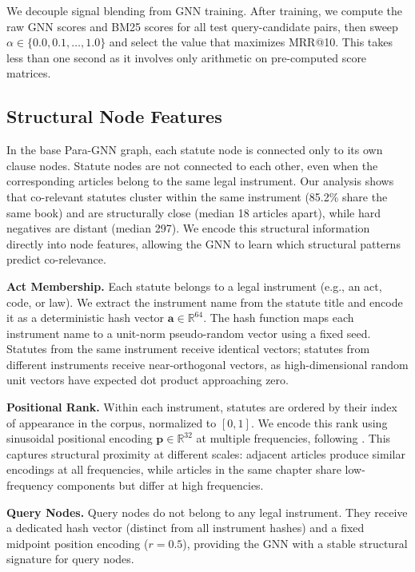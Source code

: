 We decouple signal blending from GNN training. After training, we compute the raw GNN scores and BM25 scores for all test query-candidate pairs, then sweep $\alpha \in \{0.0, 0.1, \ldots, 1.0\}$ and select the value that maximizes MRR@10. This takes less than one second as it involves only arithmetic on pre-computed score matrices.

\subsection{Structural Node Features}
\label{sec:structural}

In the base Para-GNN graph, each statute node is connected only to its own clause nodes. Statute nodes are not connected to each other, even when the corresponding articles belong to the same legal instrument. Our analysis shows that co-relevant statutes cluster within the same instrument (85.2\% share the same book) and are structurally close (median 18 articles apart), while hard negatives are distant (median 297). We encode this structural information directly into node features, allowing the GNN to learn which structural patterns predict co-relevance.

\noindent\textbf{Act Membership.} Each statute belongs to a legal instrument (e.g., an act, code, or law). We extract the instrument name from the statute title and encode it as a deterministic hash vector $\mathbf{a} \in \mathbb{R}^{64}$. The hash function maps each instrument name to a unit-norm pseudo-random vector using a fixed seed. Statutes from the same instrument receive identical vectors; statutes from different instruments receive near-orthogonal vectors, as high-dimensional random unit vectors have expected dot product approaching zero.

\noindent\textbf{Positional Rank.} Within each instrument, statutes are ordered by their index of appearance in the corpus, normalized to $[0, 1]$. We encode this rank using sinusoidal positional encoding $\mathbf{p} \in \mathbb{R}^{32}$ at multiple frequencies, following \citet{transformer}. This captures structural proximity at different scales: adjacent articles produce similar encodings at all frequencies, while articles in the same chapter share low-frequency components but differ at high frequencies.

\noindent\textbf{Query Nodes.} Query nodes do not belong to any legal instrument. They receive a dedicated hash vector (distinct from all instrument hashes) and a fixed midpoint position encoding ($r = 0.5$), providing the GNN with a stable structural signature for query nodes.

